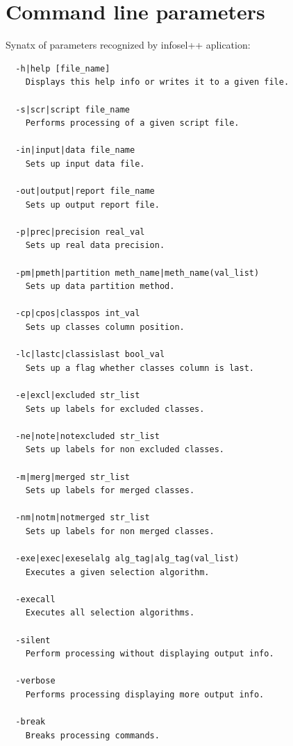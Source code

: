 \documentclass[a4paper,fleqn]{report}
\begin{document}
\chapter{Command line parameters} \label{sec:Infoselparam}
Synatx of parameters recognized by infosel++ aplication:
\begin{scriptsize}
 \begin{verbatim}
  -h|help [file_name]
    Displays this help info or writes it to a given file.

  -s|scr|script file_name
    Performs processing of a given script file.

  -in|input|data file_name
    Sets up input data file.

  -out|output|report file_name
    Sets up output report file.

  -p|prec|precision real_val
    Sets up real data precision.

  -pm|pmeth|partition meth_name|meth_name(val_list)
    Sets up data partition method.

  -cp|cpos|classpos int_val
    Sets up classes column position.

  -lc|lastc|classislast bool_val
    Sets up a flag whether classes column is last.

  -e|excl|excluded str_list
    Sets up labels for excluded classes.

  -ne|note|notexcluded str_list
    Sets up labels for non excluded classes.

  -m|merg|merged str_list
    Sets up labels for merged classes.

  -nm|notm|notmerged str_list
    Sets up labels for non merged classes.

  -exe|exec|exeselalg alg_tag|alg_tag(val_list)
    Executes a given selection algorithm.

  -execall
    Executes all selection algorithms.

  -silent
    Perform processing without displaying output info.

  -verbose
    Performs processing displaying more output info.

  -break
    Breaks processing commands.
  \end{verbatim}
\end{scriptsize}

%

%
%


\end{document}
